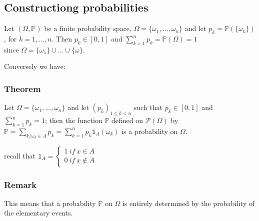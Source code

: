         \subsection{Constructiong probabilities}
            Let $(\Omega, \mathbb{P})$ be a finite probability space, $\Omega=\{\omega_1,...,\omega_n\}$ and let $p_k=\mathbb{P}(\{\omega_k\})$, for $k=1,...,n$. Then $p_k\in[0,1]$ and $\sum_{k=1}^n p_k=\mathbb{P}(\Omega)=1$ \\ since $\Omega=\{\omega_1\}\cup...\cup\{\omega\}$.

            \vspace{14pt}

            
            \noindent Conversely we have:
            \vspace{-14pt}
            \subsubsection{Theorem}
                Let $\Omega=\{\omega_1,...,\omega_n\}$ and let $(p_k)_{1\leq k < n}$ such that $p_k\in[0,1]$ and $\displaystyle\sum_{k=1}^n p_k=1$; then the function $\mathbb{P}$ defined on $\mathcal{P}(\Omega)$ by $\mathbb{P}=\displaystyle\sum_{k/\omega_k\in A} p_k = \sum_{k=1}^n p_k \mathds{1}_A (\omega_k)$ is a probability on $\Omega$.

                recall that $
                    \mathds{1}_A=\begin{cases}
                        1 \: if \: x \in A \\
                        0 \: if \: x \notin A
                        \end{cases}
                $

            \subsubsection{Remark}
            This means that a probability $\mathbb{P}$ on $\Omega$ is entirely determined by the probability of the elementary events.